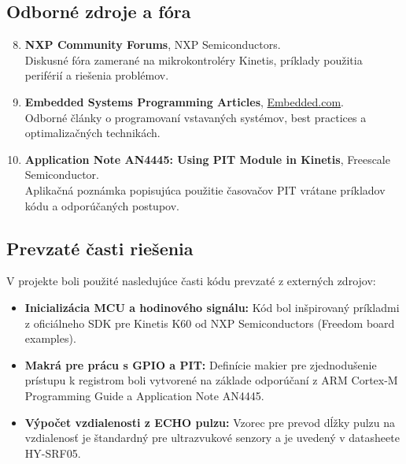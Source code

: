 \documentclass[11pt, a4paper,slovak]{article}
\begin{document}
\subsection{Odborné zdroje a fóra}

\begin{enumerate}
    \setcounter{enumi}{7}
    \item \textbf{NXP Community Forums}, NXP Semiconductors. \\
    Diskusné fóra zamerané na mikrokontroléry Kinetis, príklady použitia periférií a riešenia problémov.
    
    \item \textbf{Embedded Systems Programming Articles}, \url{Embedded.com}. \\
    Odborné články o programovaní vstavaných systémov, best practices a optimalizačných technikách.
    
    \item \textbf{Application Note AN4445: Using PIT Module in Kinetis}, Freescale Semiconductor. \\
    Aplikačná poznámka popisujúca použitie časovačov PIT vrátane príkladov kódu a odporúčaných postupov.
\end{enumerate}

\subsection{Prevzaté časti riešenia}

V projekte boli použité nasledujúce časti kódu prevzaté z externých zdrojov:

\begin{itemize}
    \item \textbf{Inicializácia MCU a hodinového signálu:} Kód bol inšpirovaný príkladmi z oficiálneho SDK pre Kinetis K60 od NXP Semiconductors (Freedom board examples).
    
    \item \textbf{Makrá pre prácu s GPIO a PIT:} Definície makier pre zjednodušenie prístupu k registrom boli vytvorené na základe odporúčaní z ARM Cortex-M Programming Guide a Application Note AN4445.
    
    \item \textbf{Výpočet vzdialenosti z ECHO pulzu:} Vzorec pre prevod dĺžky pulzu na vzdialenosť je štandardný pre ultrazvukové senzory a je uvedený v datasheete HY-SRF05.
\end{itemize}
\end{document}
